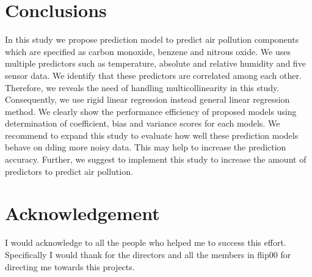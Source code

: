 \section{Conclusions} \label{sec-conclusions}

In this study we propose prediction model to predict air pollution components which are specified as carbon monoxide, benzene and nitrous oxide. We uses multiple predictors such as temperature, absolute and relative humidity and five sensor data.
We identify that these predictors are correlated among each other.
Therefore, we reveals the need of handling multicollinearity in this study.
Consequently, we use rigid linear regression instead general linear regression method.
We clearly show the performance efficiency of proposed 
models using determination of coefficient, bias and variance scores for each models.
We recommend to expand this study to evaluate how well these prediction models behave on dding more noisy data.
This may help to increase the prediction accuracy.
Further, we suggest to implement this study to increase the amount of predictors to predict air pollution.

\section*{Acknowledgement}
I would acknowledge to all the people who helped me to success this effort. Specifically I would thank for the directors and all the members in flip00 for directing me towards this projects.


